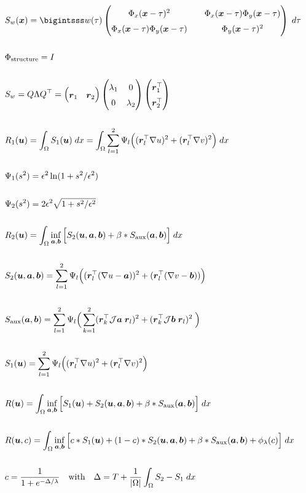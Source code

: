 \documentclass[11pt]{article}
\newcommand{\lam}{\lambda}
\newcommand{\mat}[1]{\begin{pmatrix} #1 \end{pmatrix}}
\newcommand{\Mat}[1]{\begingroup
\renewcommand*{\arraystretch}{1.5}
\mat{#1}
\endgroup}
\newcommand{\flow}{\boldsymbol{u}}
\newcommand{\x}{\boldsymbol{x}}
\newcommand{\ev}{\boldsymbol{r}}
\newcommand{\aaux}{\boldsymbol{a}}
\newcommand{\baux}{\boldsymbol{b}}
\newcommand{\T}{^\top}
\begin{document}
\begin{align*}
&S_w(\x) = \bigintsss w(\tau)\Mat{\Phi_x(\x-\tau)^2 && \Phi_x(\x-\tau)\Phi_y(\x-\tau)\\\Phi_x(\x-\tau)\Phi_y(\x-\tau) && \Phi_y(\x-\tau)^2} \;d\tau
\\\\
& \Phi_{\text{structure}} = I
\\\\
&S_w = Q \Lambda Q\T = \mat{\ev_1&\ev_2}\mat{\lam_1&0\\0&\lam_2}\mat{\ev_1\T\\ \ev_2\T}
\\\\
&R_1(\flow)=\int_\Omega S_1(\flow)\;dx = \int_\Omega \sum_{l=1}^2 \Psi_l\Big((\ev_l\T\nabla u)^2+(\ev_l\T\nabla v)^2\Big)\;dx
\\\\
&\Psi_1(s^2) = \epsilon^2\ln(1+s^2/\epsilon^2)
\\\\
&\Psi_2(s^2) = 2\epsilon^2\sqrt{1+s^2/\epsilon^2}
\\\\
&R_2(\flow) = \int_\Omega \inf_{\aaux,\baux}\Big[ S_2(\flow,\aaux,\baux) + \beta * S_{\text{aux}}(\aaux,\baux) \Big]\;dx
\\\\
&S_2(\flow,\aaux,\baux) = \sum_{l=1}^2 \Psi_l\Big( (\ev_l\T(\nabla u-\aaux))^2 + (\ev_l\T(\nabla v-\baux)) \Big)
\\\\
&S_{\text{aux}}(\aaux,\baux) = \sum_{l=1}^2 \Psi_l\Big( \sum_{k=1}^2 (\ev_k\T \mathcal{J}\aaux\;\ev_l)^2 + (\ev_k\T \mathcal{J}\baux\;\ev_l)^2\;\Big)
\\\\
&S_1(\flow) = \sum_{l=1}^2 \Psi_l\Big((\ev_l\T\nabla u)^2+(\ev_l\T\nabla v)^2\Big)
\\\\
&R(\flow) = \int_\Omega \inf_{\aaux,\baux}\Big[ S_1(\flow) +  S_2(\flow,\aaux,\baux) + \beta * S_{\text{aux}}(\aaux,\baux) \Big]\;dx
\\\\
&R(\flow, c) = \int_\Omega \inf_{\aaux,\baux}\Big[ c*S_1(\flow) +  (1-c)*S_2(\flow,\aaux,\baux) + \beta * S_{\text{aux}}(\aaux,\baux) + \phi_\lambda(c)\Big]\;dx
\\\\
&c = \frac{1}{1+e^{-\Delta/\lambda}} \quad\text{with}\quad\Delta=T+\frac{1}{|\Omega|}\int_\Omega S_2 - S_1 \; dx
\end{align*}
\end{document}
